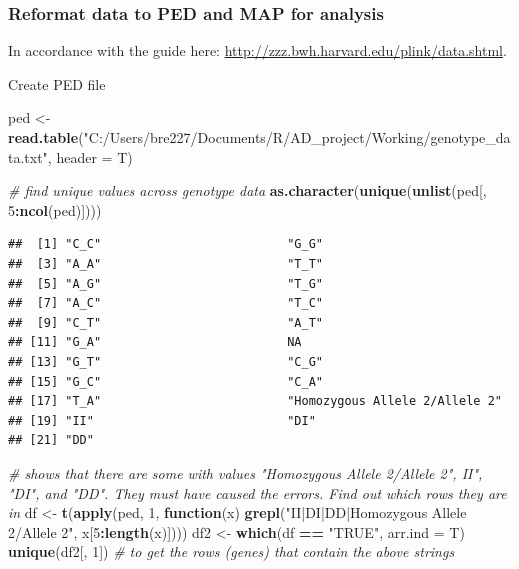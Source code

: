 \documentclass[]{article}
\newenvironment{Shaded}{\begin{snugshade}}{\end{snugshade}}
\newcommand{\KeywordTok}[1]{\textcolor[rgb]{0.13,0.29,0.53}{\textbf{#1}}}
\newcommand{\DataTypeTok}[1]{\textcolor[rgb]{0.13,0.29,0.53}{#1}}
\newcommand{\DecValTok}[1]{\textcolor[rgb]{0.00,0.00,0.81}{#1}}
\newcommand{\StringTok}[1]{\textcolor[rgb]{0.31,0.60,0.02}{#1}}
\newcommand{\CommentTok}[1]{\textcolor[rgb]{0.56,0.35,0.01}{\textit{#1}}}
\newcommand{\ControlFlowTok}[1]{\textcolor[rgb]{0.13,0.29,0.53}{\textbf{#1}}}
\newcommand{\OperatorTok}[1]{\textcolor[rgb]{0.81,0.36,0.00}{\textbf{#1}}}
\newcommand{\NormalTok}[1]{#1}
\begin{document}
\subsubsection{Reformat data to PED and MAP for
analysis}\label{reformat-data-to-ped-and-map-for-analysis}

In accordance with the guide here:
\url{http://zzz.bwh.harvard.edu/plink/data.shtml}.

Create PED file

\begin{Shaded}
\begin{Highlighting}[]
\NormalTok{ped <-}\StringTok{ }\KeywordTok{read.table}\NormalTok{(}\StringTok{"C:/Users/bre227/Documents/R/AD_project/Working/genotype_data.txt"}\NormalTok{, }\DataTypeTok{header =}\NormalTok{ T)}

\CommentTok{# find unique values across genotype data}
\KeywordTok{as.character}\NormalTok{(}\KeywordTok{unique}\NormalTok{(}\KeywordTok{unlist}\NormalTok{(ped[, }\DecValTok{5}\OperatorTok{:}\KeywordTok{ncol}\NormalTok{(ped)])))}
\end{Highlighting}
\end{Shaded}

\begin{verbatim}
##  [1] "C_C"                          "G_G"                         
##  [3] "A_A"                          "T_T"                         
##  [5] "A_G"                          "T_G"                         
##  [7] "A_C"                          "T_C"                         
##  [9] "C_T"                          "A_T"                         
## [11] "G_A"                          NA                            
## [13] "G_T"                          "C_G"                         
## [15] "G_C"                          "C_A"                         
## [17] "T_A"                          "Homozygous Allele 2/Allele 2"
## [19] "II"                           "DI"                          
## [21] "DD"
\end{verbatim}

\begin{Shaded}
\begin{Highlighting}[]
\CommentTok{# shows that there are some with values "Homozygous Allele 2/Allele 2", II", "DI", and "DD". They must have caused the errors. Find out which rows they are in}
\NormalTok{df <-}\StringTok{ }\KeywordTok{t}\NormalTok{(}\KeywordTok{apply}\NormalTok{(ped, }\DecValTok{1}\NormalTok{, }\ControlFlowTok{function}\NormalTok{(x) }\KeywordTok{grepl}\NormalTok{(}\StringTok{"II|DI|DD|Homozygous Allele 2/Allele 2"}\NormalTok{, x[}\DecValTok{5}\OperatorTok{:}\KeywordTok{length}\NormalTok{(x)])))}
\NormalTok{df2 <-}\StringTok{ }\KeywordTok{which}\NormalTok{(df }\OperatorTok{==}\StringTok{ "TRUE"}\NormalTok{, }\DataTypeTok{arr.ind =}\NormalTok{ T)}
\KeywordTok{unique}\NormalTok{(df2[, }\DecValTok{1}\NormalTok{]) }\CommentTok{# to get the rows (genes) that contain the above strings}
\end{Highlighting}
\end{Shaded}
\end{document}

